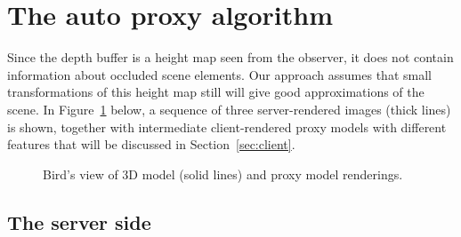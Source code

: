 \section{The auto proxy algorithm}

Since the depth buffer is a height map seen from the observer, it
does not contain information about occluded scene elements. Our approach assumes
that small transformations of this height map still will give good
approximations of the scene. In Figure~\ref{fig:2DheightmapRotated} below, a
sequence of three server-rendered images (thick lines) is shown, together with
intermediate client-rendered proxy models with different features that will be
discussed in Section~\ref{sec:client}.

\begin{figure}[htb]
  \centering
  \caption{\label{fig:2DheightmapRotated}
Bird's view of 3D model (solid lines) and proxy model renderings.
}
\end{figure}



\subsection{The server side}

